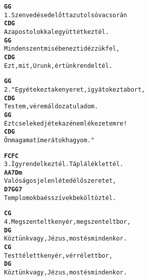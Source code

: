 \cleardoublepage
{}
\kottastart
{}
\kottaend
\begin{minipage}{\textwidth}
\begin{alltt}
\textbf{   G                  G}
1. Szenvedésed előtt az utolsó vacsorán
\textbf{      C                   D     G}
   Az apostolokkal együtt étkeztél.
\textbf{    G                  G}
   Minden szentmisében ezt idézzük fel,
\textbf{   C                        D     G}
   Ezt, mit, Urunk, értünk rendeltél.
\end{alltt}
\vspace{0.0cm}
\versszakspacing
\end{minipage}
\begin{minipage}{\textwidth}
\begin{alltt}
\textbf{    G                      G}
2. "Egyétek ezt a kenyeret, igyátok ezt a bort,
\textbf{    C                   D    G}
   Testem, vérem áldozatul adom.
\textbf{   G                       G}
   Ezt cselekedjétek az én emlékezetemre!
\textbf{   C                D      G}
   Önmagamat íme rátok hagyom."
\end{alltt}
\vspace{0.0cm}
\versszakspacing
\end{minipage}
\begin{minipage}{\textwidth}
\begin{alltt}
\textbf{   F             C    F           C}
3. Így rendelkeztél. Táplálék lettél.
\textbf{    A         A7        Dm}
   Valóságos jelenléted élő szeretet,
\textbf{    D7                            G G7}
   Templomokba és szívekbe költöztél.
\end{alltt}
\vspace{0.0cm}
\versszakspacing
\end{minipage}
\begin{minipage}{\textwidth}
\begin{alltt}
\textbf{                C                   G}
4. Megszentelt kenyér, megszentelt bor,
\textbf{                  D                    G}
   Köztünk vagy, Jézus, most és mindenkor.
\textbf{                C                  G}
   Testté lett kenyér, vérré lett bor,
\textbf{                 D                    G}
   Köztünk vagy, Jézus, most és mindenkor.
\end{alltt}
\vspace{0.0cm}
\versszakspacing
\end{minipage}
~\vspace{1.0cm}
\newline
